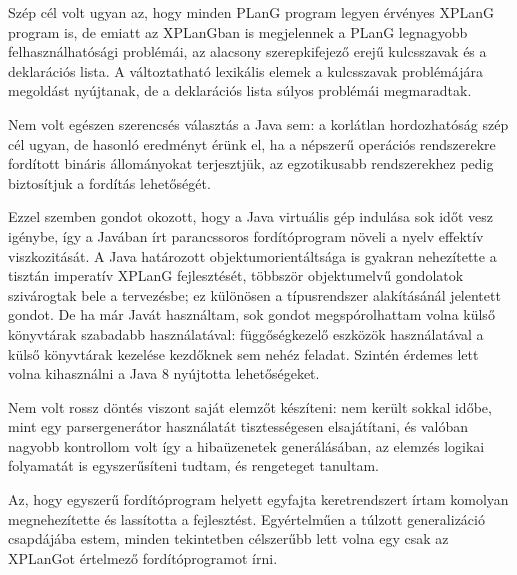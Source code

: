 Szép cél volt ugyan az, hogy minden PLanG program legyen érvényes XPLanG program is, de emiatt az XPLanGban is megjelennek a PLanG legnagyobb felhasználhatósági problémái, az alacsony szerepkifejező erejű kulcsszavak és a deklarációs lista.
A változtatható lexikális elemek a kulcsszavak problémájára megoldást nyújtanak, de a deklarációs lista súlyos problémái megmaradtak.

Nem volt egészen szerencsés választás a Java sem: a korlátlan hordozhatóság szép cél ugyan, de hasonló eredményt érünk el, ha a népszerű operációs rendszerekre fordított bináris állományokat terjesztjük, az egzotikusabb rendszerekhez pedig biztosítjuk a fordítás lehetőségét.

Ezzel szemben gondot okozott, hogy a Java virtuális gép indulása sok időt vesz igénybe, így a Javában írt parancssoros fordítóprogram növeli a nyelv effektív viszkozitását.
A Java határozott objektumorientáltsága is gyakran nehezítette a tisztán imperatív XPLanG fejlesztését, többször objektumelvű gondolatok szivárogtak bele a tervezésbe; ez különösen a típusrendszer alakításánál jelentett gondot.
De ha már Javát használtam, sok gondot megspórolhattam volna külső könyvtárak szabadabb használatával: függőségkezelő eszközök használatával a külső könyvtárak kezelése kezdőknek sem nehéz feladat.
Szintén érdemes lett volna kihasználni a Java 8 nyújtotta lehetőségeket.

Nem volt rossz döntés viszont saját elemzőt készíteni: nem került sokkal időbe, mint egy parsergenerátor használatát tisztességesen elsajátítani, és valóban nagyobb kontrollom volt így a hibaüzenetek generálásában, az elemzés logikai folyamatát is egyszerűsíteni tudtam, és rengeteget tanultam.

Az, hogy egyszerű fordítóprogram helyett egyfajta keretrendszert írtam komolyan megnehezítette és lassította a fejlesztést.
Egyértelműen a túlzott generalizáció csapdájába estem, minden tekintetben célszerűbb lett volna egy csak az XPLanGot értelmező fordítóprogramot írni.
